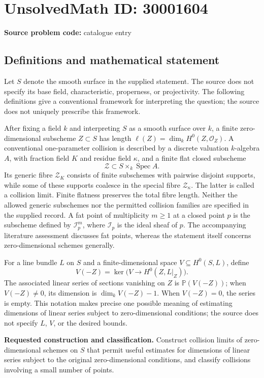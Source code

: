 \documentclass[11pt]{article}
\begin{document}
\section*{UnsolvedMath ID: 30001604}
\textbf{Source problem code:} catalogue entry
\subsection{Definitions and mathematical statement}
Let \(S\) denote the smooth surface in the supplied statement. The source does not specify its base field, characteristic, properness, or projectivity. The following definitions give a conventional framework for interpreting the question; the source does not uniquely prescribe this framework.

After fixing a field \(k\) and interpreting \(S\) as a smooth surface over \(k\), a finite zero-dimensional subscheme \(Z\subset S\) has length \(\ell(Z)=\dim_k H^0(Z,\mathcal O_Z)\). A conventional one-parameter collision is described by a discrete valuation \(k\)-algebra \(A\), with fraction field \(K\) and residue field \(\kappa\), and a finite flat closed subscheme
\[
\mathcal Z\subset S\times_k\operatorname{Spec}A.
\]
Its generic fibre \(\mathcal Z_K\) consists of finite subschemes with pairwise disjoint supports, while some of these supports coalesce in the special fibre \(\mathcal Z_\kappa\). The latter is called a collision limit. Finite flatness preserves the total fibre length. Neither the allowed generic subschemes nor the permitted collision families are specified in the supplied record. A fat point of multiplicity \(m\geq1\) at a closed point \(p\) is the subscheme defined by \(\mathcal I_p^m\), where \(\mathcal I_p\) is the ideal sheaf of \(p\). The accompanying literature assessment discusses fat points, whereas the statement itself concerns zero-dimensional schemes generally.

For a line bundle \(L\) on \(S\) and a finite-dimensional space \(V\subseteq H^0(S,L)\), define
\[
V(-Z)=\ker\bigl(V\longrightarrow H^0(Z,L|_Z)\bigr).
\]
The associated linear series of sections vanishing on \(Z\) is \(\mathbb P(V(-Z))\); when \(V(-Z)\neq0\), its dimension is \(\dim_k V(-Z)-1\). When \(V(-Z)=0\), the series is empty. This notation makes precise one possible meaning of estimating dimensions of linear series subject to zero-dimensional conditions; the source does not specify \(L\), \(V\), or the desired bounds.

\textbf{Requested construction and classification.} Construct collision limits of zero-dimensional schemes on \(S\) that permit useful estimates for dimensions of linear series subject to the original zero-dimensional conditions, and classify collisions involving a small number of points.
\end{document}
